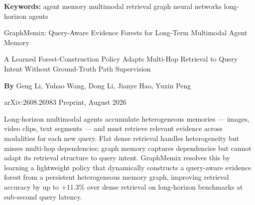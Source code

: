 \documentclass[10pt,twocolumn]{article}
\begin{document}
\setlength{\parindent}{0pt}
\setlength{\parskip}{4pt}

{\small\color{keywordgray}\textbf{Keywords:}
  agent memory \textbullet{}
  multimodal retrieval \textbullet{}
  graph neural networks \textbullet{}
  long-horizon agents}\par\vspace{4pt}

{\LARGE\bfseries\raggedright
  GraphMemix: Query-Aware Evidence Forests
  for Long-Term Multimodal Agent Memory}\par\vspace{4pt}

{\large\itshape\raggedright
  A Learned Forest-Construction Policy Adapts Multi-Hop
  Retrieval to Query Intent Without Ground-Truth Path Supervision}\par\vspace{6pt}

{\small\textbf{By} Geng Li, Yuhao Wang, Dong Li,
  Jianye Hao, Yuxin Peng}\par\vspace{2pt}

{\small\color{keywordgray}arXiv:2608.26983 \textbullet{} Preprint, August 2026}
\par\vspace{2pt}\noindent{\color{rulered}\rule{\columnwidth}{0.6pt}}\vspace{6pt}

Long-horizon multimodal agents accumulate heterogeneous memories —
images, video clips, text segments — and must retrieve relevant
evidence across modalities for each new query. Flat dense retrieval
handles heterogeneity but misses multi-hop dependencies; graph memory
captures dependencies but cannot adapt its retrieval structure to
query intent. GraphMemix resolves this by learning a lightweight
policy that dynamically constructs a query-aware evidence forest
from a persistent heterogeneous memory graph, improving retrieval
accuracy by up to $+11.3\%$ over dense retrieval on long-horizon
benchmarks at sub-second query latency.
\end{document}
